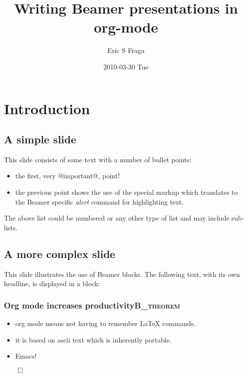 \documentclass[bigger]{beamer}
\author{Eric S Fraga}
\date{2010-03-30 Tue}
\title{Writing Beamer presentations in org-mode}
\begin{document}
\maketitle
\tableofcontents


\section{Introduction}
\label{sec:orgheadline4}

\subsection{A simple slide}
\label{sec:orgheadline1}
This slide consists of some text with a number of bullet points:

\begin{itemize}
\item the first, very @important@, point!
\item the previous point shows the use of the special markup which
translates to the Beamer specific \emph{alert} command for highlighting
text.
\end{itemize}

The above list could be numbered or any other type of list and may
include sub-lists.


\subsection{A more complex slide}
\label{sec:orgheadline3}
This slide illustrates the use of Beamer blocks.  The following text,
with its own headline, is displayed in a block:
\subsubsection[Org mode increases productivity]{Org mode increases productivity\hfill{}\textsc{B\_theorem}}
\label{sec:orgheadline2}
\begin{itemize}
\item org mode means not having to remember \LaTeX{} commands.
\item it is based on ascii text which is inherently portable.
\item Emacs!
\end{itemize}

\hfill \(\qed\)
\end{document}
